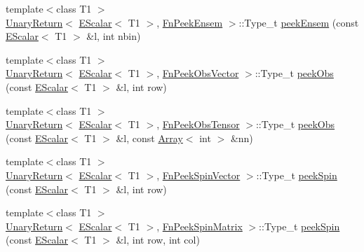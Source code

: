 \begin{DoxyCompactItemize}
\item 
{\footnotesize template$<$class T1 $>$ }\\\mbox{\hyperlink{structENSEM_1_1UnaryReturn}{Unary\+Return}}$<$ \mbox{\hyperlink{classENSEM_1_1EScalar}{E\+Scalar}}$<$ T1 $>$, \mbox{\hyperlink{structENSEM_1_1FnPeekEnsem}{Fn\+Peek\+Ensem}} $>$\+::Type\+\_\+t \mbox{\hyperlink{group__escalar_ga8fd0207eefa0fd0836dc3f2dffef209e}{peek\+Ensem}} (const \mbox{\hyperlink{classENSEM_1_1EScalar}{E\+Scalar}}$<$ T1 $>$ \&l, int nbin)
\item 
{\footnotesize template$<$class T1 $>$ }\\\mbox{\hyperlink{structENSEM_1_1UnaryReturn}{Unary\+Return}}$<$ \mbox{\hyperlink{classENSEM_1_1EScalar}{E\+Scalar}}$<$ T1 $>$, \mbox{\hyperlink{structENSEM_1_1FnPeekObsVector}{Fn\+Peek\+Obs\+Vector}} $>$\+::Type\+\_\+t \mbox{\hyperlink{group__escalar_ga7b3199ffdfb57391566d3db05e9b38c1}{peek\+Obs}} (const \mbox{\hyperlink{classENSEM_1_1EScalar}{E\+Scalar}}$<$ T1 $>$ \&l, int row)
\item 
{\footnotesize template$<$class T1 $>$ }\\\mbox{\hyperlink{structENSEM_1_1UnaryReturn}{Unary\+Return}}$<$ \mbox{\hyperlink{classENSEM_1_1EScalar}{E\+Scalar}}$<$ T1 $>$, \mbox{\hyperlink{structENSEM_1_1FnPeekObsTensor}{Fn\+Peek\+Obs\+Tensor}} $>$\+::Type\+\_\+t \mbox{\hyperlink{group__escalar_ga5715083f9573c91b9d4567559f4b2b30}{peek\+Obs}} (const \mbox{\hyperlink{classENSEM_1_1EScalar}{E\+Scalar}}$<$ T1 $>$ \&l, const \mbox{\hyperlink{classXMLArray_1_1Array}{Array}}$<$ int $>$ \&nn)
\item 
{\footnotesize template$<$class T1 $>$ }\\\mbox{\hyperlink{structENSEM_1_1UnaryReturn}{Unary\+Return}}$<$ \mbox{\hyperlink{classENSEM_1_1EScalar}{E\+Scalar}}$<$ T1 $>$, \mbox{\hyperlink{structENSEM_1_1FnPeekSpinVector}{Fn\+Peek\+Spin\+Vector}} $>$\+::Type\+\_\+t \mbox{\hyperlink{group__escalar_gaa833c21339250a427d537f2c3431f9e2}{peek\+Spin}} (const \mbox{\hyperlink{classENSEM_1_1EScalar}{E\+Scalar}}$<$ T1 $>$ \&l, int row)
\item 
{\footnotesize template$<$class T1 $>$ }\\\mbox{\hyperlink{structENSEM_1_1UnaryReturn}{Unary\+Return}}$<$ \mbox{\hyperlink{classENSEM_1_1EScalar}{E\+Scalar}}$<$ T1 $>$, \mbox{\hyperlink{structENSEM_1_1FnPeekSpinMatrix}{Fn\+Peek\+Spin\+Matrix}} $>$\+::Type\+\_\+t \mbox{\hyperlink{group__escalar_gadd6441efc37438418dda6c0e5a501f10}{peek\+Spin}} (const \mbox{\hyperlink{classENSEM_1_1EScalar}{E\+Scalar}}$<$ T1 $>$ \&l, int row, int col)

\end{DoxyCompactItemize}
